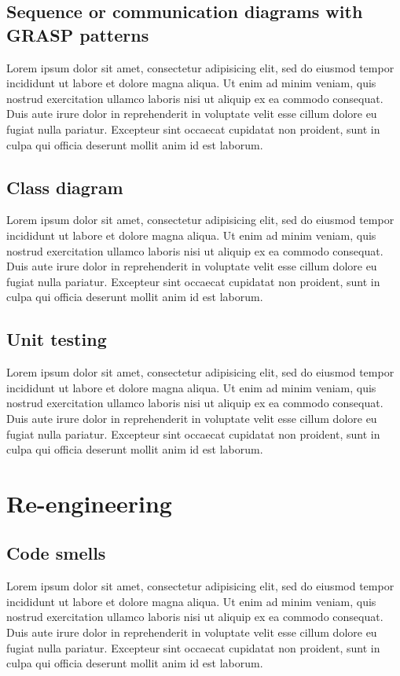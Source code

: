 \documentclass[12pt,a4paper]{article}
\begin{document}
\subsection{Sequence or communication diagrams with GRASP patterns}
Lorem ipsum dolor sit amet, consectetur adipisicing elit, sed do eiusmod tempor incididunt ut labore et dolore magna aliqua. Ut enim ad minim veniam, quis nostrud exercitation ullamco laboris nisi ut aliquip ex ea commodo consequat. Duis aute irure dolor in reprehenderit in voluptate velit esse cillum dolore eu fugiat nulla pariatur. Excepteur sint occaecat cupidatat non proident, sunt in culpa qui officia deserunt mollit anim id est laborum.

\subsection{Class diagram}
Lorem ipsum dolor sit amet, consectetur adipisicing elit, sed do eiusmod tempor incididunt ut labore et dolore magna aliqua. Ut enim ad minim veniam, quis nostrud exercitation ullamco laboris nisi ut aliquip ex ea commodo consequat. Duis aute irure dolor in reprehenderit in voluptate velit esse cillum dolore eu fugiat nulla pariatur. Excepteur sint occaecat cupidatat non proident, sunt in culpa qui officia deserunt mollit anim id est laborum.

\subsection{Unit testing}
Lorem ipsum dolor sit amet, consectetur adipisicing elit, sed do eiusmod tempor incididunt ut labore et dolore magna aliqua. Ut enim ad minim veniam, quis nostrud exercitation ullamco laboris nisi ut aliquip ex ea commodo consequat. Duis aute irure dolor in reprehenderit in voluptate velit esse cillum dolore eu fugiat nulla pariatur. Excepteur sint occaecat cupidatat non proident, sunt in culpa qui officia deserunt mollit anim id est laborum.

\section{Re-engineering}

\subsection{Code smells}
Lorem ipsum dolor sit amet, consectetur adipisicing elit, sed do eiusmod tempor incididunt ut labore et dolore magna aliqua. Ut enim ad minim veniam, quis nostrud exercitation ullamco laboris nisi ut aliquip ex ea commodo consequat. Duis aute irure dolor in reprehenderit in voluptate velit esse cillum dolore eu fugiat nulla pariatur. Excepteur sint occaecat cupidatat non proident, sunt in culpa qui officia deserunt mollit anim id est laborum. \\
\end{document}
